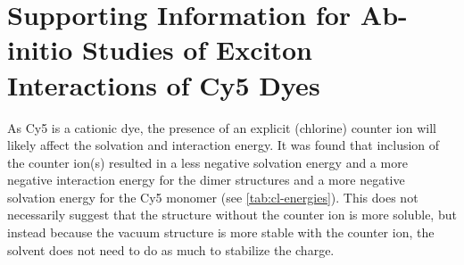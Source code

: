 \chapter{Supporting Information for Ab-initio Studies of Exciton Interactions of Cy5 Dyes}
\label{chap:ab-initio-SI}

\newpage %

As Cy5 is a cationic dye, the presence of an explicit (chlorine) counter ion will likely affect the solvation and interaction energy. It was found that inclusion of the counter ion(s) resulted in a less negative solvation energy and a more negative interaction energy for the dimer structures and a more negative solvation energy for the Cy5 monomer (see \autoref{tab:cl-energies}). This does not necessarily suggest that the structure without the counter ion is more soluble, but instead because the vacuum structure is more stable with the counter ion, the solvent does not need to do as much to stabilize the charge.

